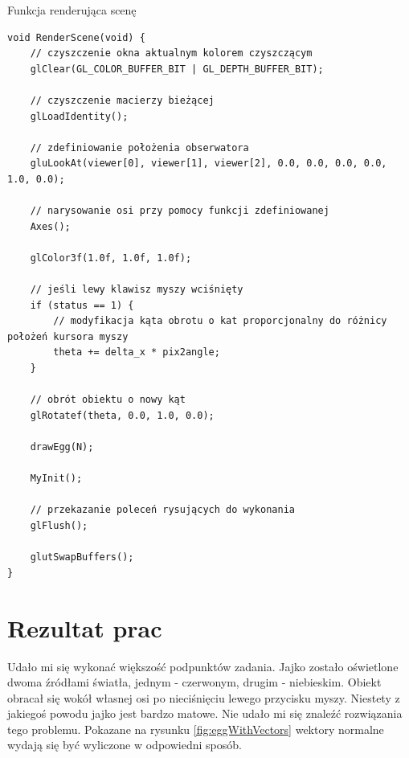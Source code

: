 \documentclass[12pt,a4paper,titlepage]{article}
\begin{document}
\begin{listing}[H]
\caption{Funkcja renderująca scenę}
\begin{verbatim}
void RenderScene(void) {
    // czyszczenie okna aktualnym kolorem czyszczącym
    glClear(GL_COLOR_BUFFER_BIT | GL_DEPTH_BUFFER_BIT);
    
    // czyszczenie macierzy bieżącej
    glLoadIdentity();
    
    // zdefiniowanie położenia obserwatora
    gluLookAt(viewer[0], viewer[1], viewer[2], 0.0, 0.0, 0.0, 0.0, 1.0, 0.0);
    
    // narysowanie osi przy pomocy funkcji zdefiniowanej 
    Axes();
    
    glColor3f(1.0f, 1.0f, 1.0f);
    
    // jeśli lewy klawisz myszy wciśnięty
    if (status == 1) {
        // modyfikacja kąta obrotu o kat proporcjonalny do różnicy położeń kursora myszy
        theta += delta_x * pix2angle;
    }

    // obrót obiektu o nowy kąt
    glRotatef(theta, 0.0, 1.0, 0.0);
    
    drawEgg(N);
    
    MyInit();
    
    // przekazanie poleceń rysujących do wykonania
    glFlush();
    
    glutSwapBuffers();
}
\end{verbatim}
\end{listing}

\newpage
\section{Rezultat prac}
Udało mi się wykonać większość podpunktów zadania. Jajko zostało oświetlone dwoma źródłami światła, jednym - czerwonym, drugim - niebieskim. Obiekt obracał się wokół własnej osi po nieciśnięciu lewego przycisku myszy. Niestety z jakiegoś powodu jajko jest bardzo matowe. Nie udało mi się znaleźć rozwiązania tego problemu. Pokazane na rysunku \ref{fig:eggWithVectors} wektory normalne wydają się być wyliczone w odpowiedni sposób.
\end{document}
